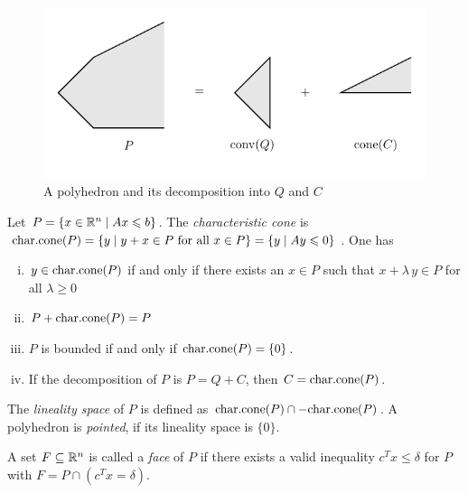\begin{figure}[htbp]
  \begin{center}
    \includegraphics{figures/PicPolyhedra1.pdf}
  \end{center}
  \caption{A polyhedron and its decomposition into $Q$ and $C$\label{po:fig:decomp}}
\end{figure}




Let $P = \{ x \in \mathbb{R}^n \mid Ax\leqslant b\}$. The \emph{characteristic cone} is 
$\mathrm{char.cone}(P) =\{ y \mid y+x \in P \text{ for all } x \in P\} = \{y \mid Ay
\leqslant0\}$. One has
\begin{enumerate}[i)]
\item $y \in \mathrm{char.cone}(P)$ if and only if there exists an $x \in P$ such
  that $x + \lambda\,y \in P$ for all $\lambda\geq0$ 
\item $P + \mathrm{char.cone}(P)=P$
\item $P$ is bounded if and only if $\mathrm{char.cone}(P)=\{0\}$. 
\item If the decomposition of $P$ is $P = Q +C$, then $C = \mathrm{char.cone}(P)$. 
\end{enumerate}



The \emph{lineality space} of $P$ is defined as $\mathrm{char.cone}(P) \cap -
\mathrm{char.cone}(P)$. A polyhedron is \emph{pointed}, if its lineality space is
$\{0\}$.






\begin{definition}
  \label{def:f4}
  A set $F\subseteq\mathbb{R}^n$ is called a \emph{face} of $P$ if there exists a
  valid inequality $c^Tx\leq\delta$ for $P$ with $F = P \cap (c^Tx = \delta)$. 
\end{definition}
 
